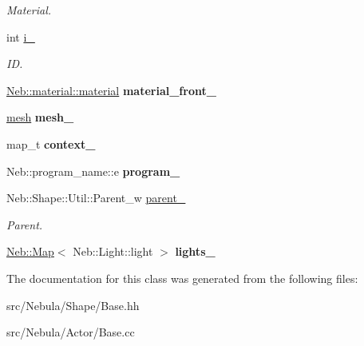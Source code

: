 \begin{DoxyCompactItemize}
\begin{DoxyCompactList}\small\item\em Material. \end{DoxyCompactList}\item 
\hypertarget{classNeb_1_1Shape_1_1Base_ac080174461c07d79ba809ae1291d3260}{int \hyperlink{classNeb_1_1Shape_1_1Base_ac080174461c07d79ba809ae1291d3260}{i\-\_\-}}\label{classNeb_1_1Shape_1_1Base_ac080174461c07d79ba809ae1291d3260}

\begin{DoxyCompactList}\small\item\em I\-D. \end{DoxyCompactList}\item 
\hypertarget{classNeb_1_1Shape_1_1Base_a35f56410d30b2a2e343032f3455e442b}{\hyperlink{classNeb_1_1material_1_1material}{Neb\-::material\-::material} {\bfseries material\-\_\-front\-\_\-}}\label{classNeb_1_1Shape_1_1Base_a35f56410d30b2a2e343032f3455e442b}

\item 
\hypertarget{classNeb_1_1Shape_1_1Base_a2086d7c205e5252154638253ae866773}{\hyperlink{classNeb_1_1mesh}{mesh} {\bfseries mesh\-\_\-}}\label{classNeb_1_1Shape_1_1Base_a2086d7c205e5252154638253ae866773}

\item 
\hypertarget{classNeb_1_1Shape_1_1Base_a1b211583183a5ade3976dae341fa474b}{map\-\_\-t {\bfseries context\-\_\-}}\label{classNeb_1_1Shape_1_1Base_a1b211583183a5ade3976dae341fa474b}

\item 
\hypertarget{classNeb_1_1Shape_1_1Base_a8e2e8da14ea737c5981da827615d54c8}{Neb\-::program\-\_\-name\-::e {\bfseries program\-\_\-}}\label{classNeb_1_1Shape_1_1Base_a8e2e8da14ea737c5981da827615d54c8}

\item 
\hypertarget{classNeb_1_1Shape_1_1Base_a905e6814c389cbeda30725da78fa4406}{Neb\-::\-Shape\-::\-Util\-::\-Parent\-\_\-w \hyperlink{classNeb_1_1Shape_1_1Base_a905e6814c389cbeda30725da78fa4406}{parent\-\_\-}}\label{classNeb_1_1Shape_1_1Base_a905e6814c389cbeda30725da78fa4406}

\begin{DoxyCompactList}\small\item\em Parent. \end{DoxyCompactList}\item 
\hypertarget{classNeb_1_1Shape_1_1Base_a7b0afe69e3056a80936efe314ebd7afd}{\hyperlink{classNeb_1_1Map}{Neb\-::\-Map}$<$ Neb\-::\-Light\-::light $>$ {\bfseries lights\-\_\-}}\label{classNeb_1_1Shape_1_1Base_a7b0afe69e3056a80936efe314ebd7afd}

\end{DoxyCompactItemize}


The documentation for this class was generated from the following files\-:\begin{DoxyCompactItemize}
\item 
src/\-Nebula/\-Shape/Base.\-hh\item 
src/\-Nebula/\-Actor/Base.\-cc\end{DoxyCompactItemize}
